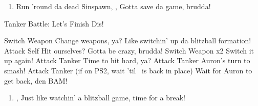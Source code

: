 \begin{enumerate}[resume]
    \item Run 'round da dead Sinspawn, \save, \sd Gotta save da game, brudda!
\end{enumerate}
\begin{battle}[1000]{Tanker Battle: Let's Finish Dis!}
    \begin{itemize}
        \tidusf Switch Weapon Change weapons, ya? Like switchin' up da blitzball formation!
        \auronf Attack Self Hit ourselves? Gotta be crazy, brudda!
        \tidusf Switch Weapon x2 Switch it up again!
        \tidusf Attack Tanker Time to hit hard, ya?
        \auronf Attack Tanker Auron's turn to smash!
        \tidusf Attack Tanker (if on PS2, wait 'til \auron\ is back in place) Wait for Auron to get back, den BAM!
    \end{itemize}
\end{battle}
\begin{enumerate}[resume]
    \item \cs[2:00], \skippablefmv Just like watchin' a blitzball game, time for a break!
\end{enumerate}